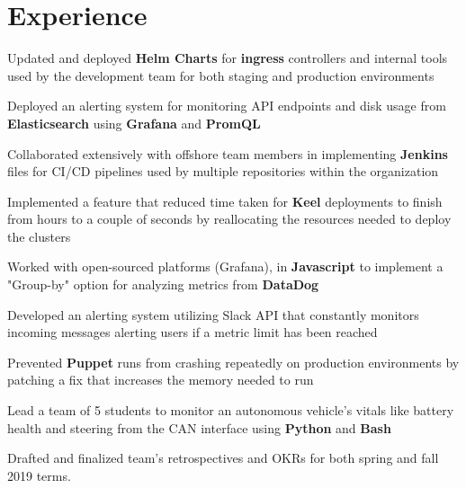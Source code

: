 \documentclass[]{deedy-resume-openfont}
\begin{document}
\begin{minipage}[t]{0.66\textwidth} 


\section{Experience}
\vspace{\topsep} %
\begin{tightemize} 
\item Updated and deployed \textbf{Helm Charts} for \textbf{ingress} controllers and internal tools used by the development team for both staging and production environments
\item Deployed an alerting system for monitoring API endpoints and disk usage  from \textbf{Elasticsearch} using \textbf{Grafana} and \textbf{PromQL} 
\item Collaborated extensively with offshore team members in implementing \textbf{Jenkins} files for CI/CD pipelines used by multiple repositories within the organization 
\item Implemented a feature that reduced time taken for \textbf{Keel} deployments to finish from hours to a couple of seconds by reallocating the resources needed to deploy the clusters
\end{tightemize}
\sectionsep
{}
\begin{tightemize} 
\item Worked with open-sourced platforms (Grafana), in \textbf{Javascript} to implement a "Group-by" option for analyzing metrics from \textbf {DataDog}
\item Developed an alerting system utilizing Slack API that constantly monitors incoming messages alerting users if a metric limit has been reached
\item  Prevented \textbf{Puppet} runs from crashing repeatedly on production environments by patching a fix that increases the memory needed to run
\end{tightemize}
\sectionsep

\begin{tightemize}
\item Lead a team of 5 students to monitor an autonomous vehicle's vitals like battery health and steering from the CAN interface using \textbf{Python} and \textbf{Bash}
\item Drafted and finalized team's retrospectives and OKRs for both spring and fall 2019 terms.
\end{tightemize}
\sectionsep


\end{minipage}
\end{document}
